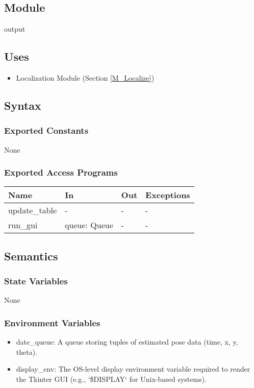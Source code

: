 \documentclass[12pt, titlepage]{article}
\begin{document}
\subsection{Module}

output

\subsection{Uses}
\begin{itemize}
  \item Localization Module (Section \ref{M_Localize})
\end{itemize}

\subsection{Syntax}

\subsubsection{Exported Constants}
None

\subsubsection{Exported Access Programs}

\begin{center}
\begin{tabular}{p{4cm} p{4cm} p{4cm} p{2cm}}
\hline
\textbf{Name} & \textbf{In} & \textbf{Out} & \textbf{Exceptions} \\
\hline
update\_table & - & - & - \\
run\_gui & queue: Queue & - & - \\
\hline
\end{tabular}
\end{center}

\subsection{Semantics}

\subsubsection{State Variables}
None
\subsubsection{Environment Variables}
\begin{itemize}
  \item date\_queue: A queue storing tuples of estimated pose data (time, x, y, theta).
  \item display\_env: The OS-level display environment variable required to render the Tkinter GUI (e.g., `\$DISPLAY` for Unix-based systems).
\end{itemize}
\end{document}
